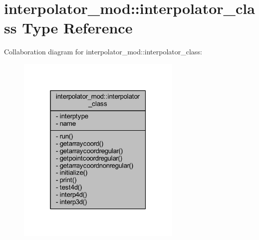 \hypertarget{structinterpolator__mod_1_1interpolator__class}{}\section{interpolator\+\_\+mod\+:\+:interpolator\+\_\+class Type Reference}
\label{structinterpolator__mod_1_1interpolator__class}


Collaboration diagram for interpolator\+\_\+mod\+:\+:interpolator\+\_\+class\+:\nopagebreak
\begin{figure}[H]
\begin{center}
\leavevmode
\includegraphics[width=223pt]{structinterpolator__mod_1_1interpolator__class__coll__graph}
\end{center}
\end{figure}
